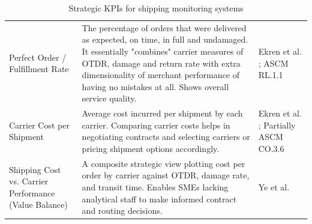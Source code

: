 \documentclass{imc-inf}
\begin{document}
\begin{table}[!htbp]
\begin{tabular}{@{}>{\raggedright\arraybackslash}p{4cm}p{8cm}>{\raggedright\arraybackslash}p{3cm}@{}}
    Perfect Order / Fulfillment Rate                                                                                                                                                                                                                                                    &
    The percentage of orders that were delivered as expected, on time, in full and undamaged. It essentially "combines" carrier measures of OTDR, damage and return rate with extra dimensionality of merchant performance of having no mistakes at all. Shows overall service quality. &
    Ekren et al. \cite{ekrenEnhancingEgroceryOrder2025}; ASCM RL.1.1 \cite{ascm2022scor}                                                                                                                                                                                                                                         \\[6pt]

    Carrier Cost per Shipment                                                                                                                                                                                                                                                           &
    Average cost incurred per shipment by each carrier. Comparing carrier costs helps in negotiating contracts and selecting carriers or pricing shipment options accordingly.                                                                                                          &
    Ekren et al. \cite{ekrenEnhancingEgroceryOrder2025}; Partially ASCM CO.3.6 \cite{ascm2022scor}                                                                                                                                                                                                                               \\[6pt]

    Shipping Cost vs. Carrier Performance (Value Balance)                                                                                                                                                                                                                               &
    A composite strategic view plotting cost per order by carrier against OTDR, damage rate, and transit time. Enables SMEs lacking analytical staff to make informed contract and routing decisions.                                                                                   &
    Ye et al. \cite{yeContextualStochasticOptimization2025}                                                                                                                                                                                                                                                                      \\[6pt]

    \bottomrule
  \end{tabular}
  \caption{Strategic KPIs for shipping monitoring systems}
  \label{tab:strategic-kpis}
\end{table}
\end{document}
